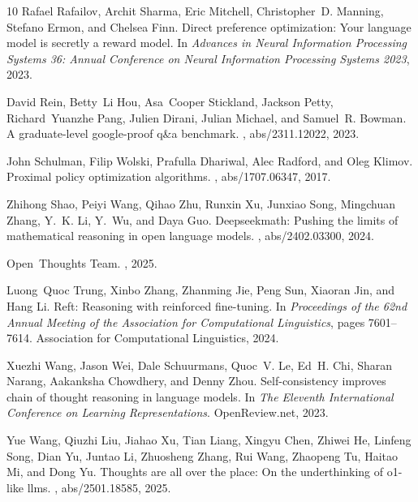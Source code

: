 \documentclass{article}
\begin{document}
{\begin{thebibliography}{10}
        Rafael Rafailov, Archit Sharma, Eric Mitchell, Christopher~D. Manning, Stefano Ermon, and Chelsea Finn.
        \newblock Direct preference optimization: Your language model is secretly a reward model.
        \newblock In {\em Advances in Neural Information Processing Systems 36: Annual Conference on Neural Information Processing Systems 2023}, 2023.
        
        David Rein, Betty~Li Hou, Asa~Cooper Stickland, Jackson Petty, Richard~Yuanzhe Pang, Julien Dirani, Julian Michael, and Samuel~R. Bowman.
         {A} graduate-level google-proof q{\&}a benchmark.
        , abs/2311.12022, 2023.
        
        John Schulman, Filip Wolski, Prafulla Dhariwal, Alec Radford, and Oleg Klimov.
        \newblock Proximal policy optimization algorithms.
        , abs/1707.06347, 2017.
        
        Zhihong Shao, Peiyi Wang, Qihao Zhu, Runxin Xu, Junxiao Song, Mingchuan Zhang, Y.~K. Li, Y.~Wu, and Daya Guo.
        \newblock Deepseekmath: Pushing the limits of mathematical reasoning in open language models.
        , abs/2402.03300, 2024.
        
        Open~Thoughts Team.
        , 2025.
        
        Luong~Quoc Trung, Xinbo Zhang, Zhanming Jie, Peng Sun, Xiaoran Jin, and Hang Li.
        \newblock Reft: Reasoning with reinforced fine-tuning.
        \newblock In {\em Proceedings of the 62nd Annual Meeting of the Association for Computational Linguistics}, pages 7601--7614. Association for Computational Linguistics, 2024.
        
        Xuezhi Wang, Jason Wei, Dale Schuurmans, Quoc~V. Le, Ed~H. Chi, Sharan Narang, Aakanksha Chowdhery, and Denny Zhou.
        \newblock Self-consistency improves chain of thought reasoning in language models.
        \newblock In {\em The Eleventh International Conference on Learning Representations}. OpenReview.net, 2023.
        
        Yue Wang, Qiuzhi Liu, Jiahao Xu, Tian Liang, Xingyu Chen, Zhiwei He, Linfeng Song, Dian Yu, Juntao Li, Zhuosheng Zhang, Rui Wang, Zhaopeng Tu, Haitao Mi, and Dong Yu.
        \newblock Thoughts are all over the place: On the underthinking of o1-like llms.
        , abs/2501.18585, 2025.
        

\end{thebibliography}}
\end{document}

